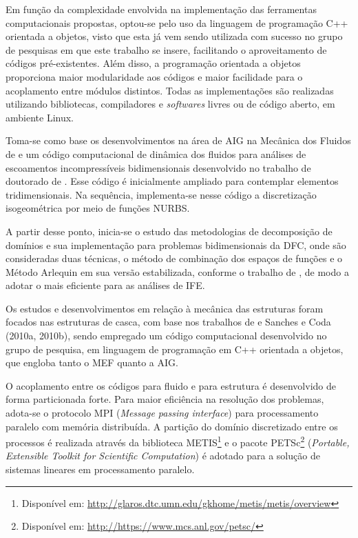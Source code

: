 Em função da complexidade envolvida na implementação das ferramentas computacionais propostas, optou-se pelo uso da linguagem de programação C++ orientada a objetos, visto que esta já vem sendo utilizada com sucesso no grupo de pesquisas em que este trabalho se insere, facilitando o aproveitamento de códigos pré-existentes. Além disso, a programação orientada a objetos proporciona maior modularidade aos códigos e maior facilidade para o acoplamento entre módulos distintos. Todas as implementações são realizadas utilizando bibliotecas, compiladores e \textit{softwares} livres ou de código aberto, em ambiente Linux.

Toma-se como base os desenvolvimentos na área de AIG na Mecânica dos Fluidos de  e um código computacional de dinâmica dos fluidos para análises de escoamentos incompressíveis bidimensionais desenvolvido no trabalho de doutorado de . Esse código é inicialmente ampliado para contemplar elementos tridimensionais. Na sequência, implementa-se nesse código a discretização isogeométrica por meio de funções NURBS.

A partir desse ponto, inicia-se o estudo das metodologias de decomposição de domínios e sua implementação para problemas bidimensionais da DFC, onde são consideradas duas técnicas, o método de combinação dos espaços de funções \cite{Rosa:2021,Rosa:2022} e o Método Arlequin em sua versão estabilizada, conforme o trabalho de , de modo a adotar o mais eficiente para as análises de IFE.

Os estudos e desenvolvimentos em relação à mecânica das estruturas foram focados nas estruturas de casca, com base nos trabalhos de  e Sanches e Coda (2010a, 2010b), sendo empregado um código computacional desenvolvido no grupo de pesquisa, em linguagem de programação em C++ orientada a objetos, que engloba tanto o MEF quanto a AIG.

O acoplamento entre os códigos para fluido e para estrutura é desenvolvido de forma particionada forte. Para maior eficiência na resolução dos problemas, adota-se o protocolo MPI (\textit{Message passing interface}) para processamento paralelo com memória distribuída. A partição do domínio discretizado entre os processos é realizada através da biblioteca METIS\footnote{Disponível em: \url{http://glaros.dtc.umn.edu/gkhome/metis/metis/overview}} e o pacote  PETSc\footnote{Disponível em: \url{http://https://www.mcs.anl.gov/petsc/}} (\textit{Portable, Extensible Toolkit for Scientific Computation}) é adotado para a solução de sistemas lineares em processamento paralelo.

